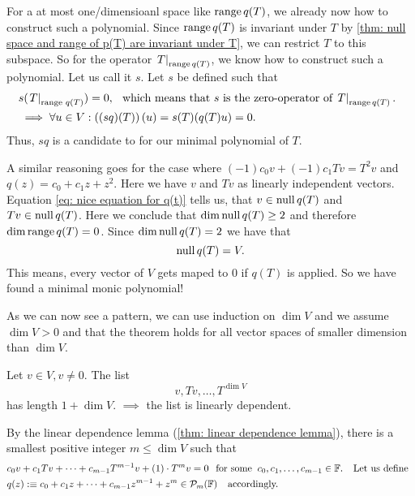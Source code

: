 \begin{prf}
  For a at most one\-/dimensioanl space like $\operatorname{range} q(T)$, we already now how to construct such a polynomial. Since $\operatorname{range} q(T)$ is invariant under $T$ by \ref{thm: null space and range of p(T) are invariant under T}, we can restrict $T$ to this subspace. So for the operator $\left. T \right |_{\operatorname{range} q(T)}$, we know how to construct such a polynomial. Let us call it $s$. Let $s$ be defined such that
  \begin{equation}
    \begin{aligned}
        &s (\left. T \right |_{\text{range $q(T)$}})=0, \;\;\, \text{which means that $s$ is the zero-operator of $\left. T \right |_{\operatorname{range} q(T)}.$}\;\;\\
        &\implies \forall u \in V: \left((sq)(T)\right)(u) = s(T)(q(T)u)=0.
    \end{aligned}
  \end{equation}
  Thus, $sq$ is a candidate to for our minimal polynomial of $T$.

  A similar reasoning goes for the case where $(-1)c_0v+(-1)c_1Tv=T^2v$ and $q(z) = c_0+c_1z+z^2.$
  Here we have $v$ and $Tv$ as linearly independent vectors. Equation \eqref{eq: nice equation for q(t)} tells us, that $v\in \operatorname{null} q(T)$ and $Tv \in \operatorname{null} q(T)$. Here we conclude that $\dim \operatorname{null} q(T) \geq 2$ and therefore $\dim \operatorname{range} q(T) = 0$.
  Since $\dim \operatorname{null} q(T) = 2$ we have that
  \begin{equation}
    \operatorname{null} q(T) = V.
  \end{equation}
  This means, every vector of $V$ gets maped to $0$ if $q(T)$ is applied. So we have found a minimal monic polynomial!

  As we can now see a pattern, we can use induction on $\dim V$ and we assume $\dim V > 0$ and that the theorem holds for all vector spaces of smaller dimension than $\dim V$.

  Let $v\in V, v \neq 0$. The list \begin{equation}
    v, Tv, \dots, T^{\dim V}
  \end{equation}
  has length $1+\dim V.$
  $\implies$ the list is linearly dependent.

  By the linear dependence lemma (\ref{thm: linear dependence lemma}), there is a smallest positive integer $m\leq \dim V$ such that
  \begin{equation}
    \begin{aligned}
      &c_0 v + c_1 Tv + \cdots + c_{m-1} T^{m-1} v + (1)\cdot T^m v = 0
      \;\;\, \text{for some}\;\; c_0, c_1, \ldots, c_{m-1} \in \mathbb{F}. \;\;\, \text{ Let us define}\;\;\\
      &q(z) :\equiv c_0 + c_1z + \cdots + c_{m-1} z^{m-1} +z^{m} \in \mathcal{P}_m (\mathbb{F}) \;\;\, \text{ accordingly.}\;\;
    \end{aligned}
  \end{equation}


\end{prf}
